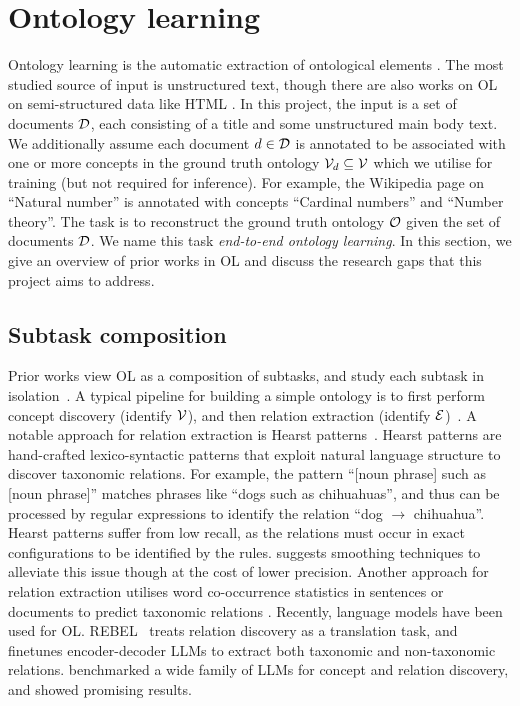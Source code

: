 \section{Ontology learning}  \label{sec:ontology-learning}

Ontology learning is the automatic extraction of ontological elements \cite{hazman2011survey}. The most studied source of input is unstructured text, though there are also works on OL on semi-structured data like HTML \cite{karoui2004ontology}. In this project, the input is a set of documents $\mathcal{D}$, each consisting of a title and some unstructured main body text. We additionally assume each document $d \in \mathcal{D}$ is annotated to be associated with one or more concepts in the ground truth ontology $\mathcal{V}_{d} \subseteq \mathcal{V}$ which we utilise for training (but not required for inference). For example, the Wikipedia page on ``Natural number'' is annotated with concepts ``Cardinal numbers'' and ``Number theory''. The task is to reconstruct the ground truth ontology $\mathcal{O}$ given the set of documents $\mathcal{D}$. We name this task \emph{end-to-end ontology learning}. In this section, we give an overview of prior works in OL and discuss the research gaps that this project aims to address.

\subsection{Subtask composition}

Prior works view OL as a composition of subtasks, and study each subtask in isolation~\cite{buitelaar2005ontology,asim2018survey}. A typical pipeline for building a simple ontology is to first perform concept discovery (identify $\mathcal{V}$), and then relation extraction (identify $\mathcal{E}$)~\cite{cimiano2005text2onto,kaushik2018automatic}. A notable approach for relation extraction is Hearst patterns~\cite{hearst1998automated}. Hearst patterns are hand-crafted lexico-syntactic patterns that exploit natural language structure to discover taxonomic relations. For example, the pattern ``[noun phrase] such as [noun phrase]'' matches phrases like ``dogs such as chihuahuas'', and thus can be processed by regular expressions to identify the relation ``dog $\to$ chihuahua''. Hearst patterns suffer from low recall, as the relations must occur in exact configurations to be identified by the rules. \citet{roller2018hearst} suggests smoothing techniques to alleviate this issue though at the cost of lower precision. Another approach for relation extraction utilises word co-occurrence statistics in sentences or documents to predict taxonomic relations \cite{cimiano2005learning}. Recently, language models have been used for OL. REBEL~\cite{cabot2021rebel} treats relation discovery as a translation task, and finetunes encoder-decoder LLMs to extract both taxonomic and non-taxonomic relations. \citet{babaei2023llms4ol} benchmarked a wide family of LLMs for concept and relation discovery, and showed promising results.

